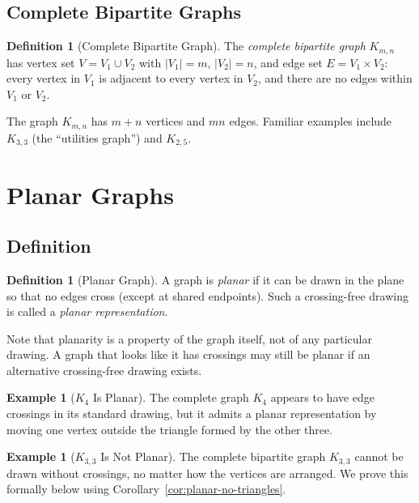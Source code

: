 \documentclass[11pt, a4paper, notitlepage]{report}
\theoremstyle{definition}
\newtheorem{definition}[theorem]{Definition}
\newtheorem{example}[theorem]{Example}
\theoremstyle{remark}
\begin{document}
\subsection{Complete Bipartite Graphs}
\label{subsec:complete-bipartite}

\begin{definition}[Complete Bipartite Graph]
\label{def:complete-bipartite}
The \emph{complete bipartite graph} $K_{m,n}$ has vertex set $V = V_1 \cup V_2$ with $|V_1| = m$, $|V_2| = n$, and edge set $E = V_1 \times V_2$: every vertex in $V_1$ is adjacent to every vertex in $V_2$, and there are no edges within $V_1$ or $V_2$.
\end{definition}

The graph $K_{m,n}$ has $m + n$ vertices and $mn$ edges. Familiar examples include $K_{3,3}$ (the ``utilities graph'') and $K_{2,5}$.

\section{Planar Graphs}
\label{sec:planar}

\subsection{Definition}
\label{subsec:planar-def}

\begin{definition}[Planar Graph]
\label{def:planar}
A graph is \emph{planar} if it can be drawn in the plane so that no edges cross (except at shared endpoints). Such a crossing-free drawing is called a \emph{planar representation}.
\end{definition}

Note that planarity is a property of the graph itself, not of any particular drawing. A graph that looks like it has crossings may still be planar if an alternative crossing-free drawing exists.

\begin{example}[$K_4$ Is Planar]
\label{ex:k4-planar}
The complete graph $K_4$ appears to have edge crossings in its standard drawing, but it admits a planar representation by moving one vertex outside the triangle formed by the other three.
\end{example}

\begin{example}[$K_{3,3}$ Is Not Planar]
\label{ex:k33-nonplanar}
The complete bipartite graph $K_{3,3}$ cannot be drawn without crossings, no matter how the vertices are arranged. We prove this formally below using Corollary~\ref{cor:planar-no-triangles}.
\end{example}
\end{document}
